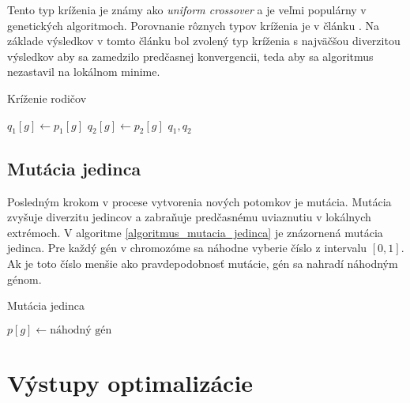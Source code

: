 Tento typ kríženia je známy ako \textit{uniform crossover} a je veľmi populárny v genetických algoritmoch.
Porovnanie rôznych typov kríženia je v článku \cite{7414781}.
Na základe výsledkov v tomto článku bol zvolený typ kríženia s najväčšou diverzitou výsledkov aby sa zamedzilo predčasnej konvergencii, teda aby sa algoritmus nezastavil na lokálnom minime.

\vspace*{\dimexpr 0.5\baselineskip\relax}
\begin{algorithm}[h]
\caption{Kríženie rodičov}
\label{algoritmus_krizenie_rodicov}
   {
     {
      $q_1[g] \gets p_1[g]$\;
      $q_2[g] \gets p_2[g]$\;
    }
  }
  \Return $q_1, q_2$\;
\end{algorithm}

\subsection*{Mutácia jedinca}
Posledným krokom v procese vytvorenia nových potomkov je mutácia.
Mutácia zvyšuje diverzitu jedincov a zabraňuje predčasnému uviaznutiu v lokálnych extrémoch.
V algoritme \ref{algoritmus_mutacia_jedinca} je znázornená mutácia jedinca.
Pre každý gén v chromozóme sa náhodne vyberie číslo z intervalu $[0,1]$.
Ak je toto číslo menšie ako pravdepodobnosť mutácie, gén sa nahradí náhodným génom.

\vspace*{\dimexpr 0.5\baselineskip\relax}
\begin{algorithm}[h]
\caption{Mutácia jedinca}
\label{algoritmus_mutacia_jedinca}
   {
     {
      $p[g] \gets \text{náhodný gén}$\;
    }
  }
\end{algorithm}

\section{Výstupy optimalizácie}
\label{vystupy_optimalizacie}

